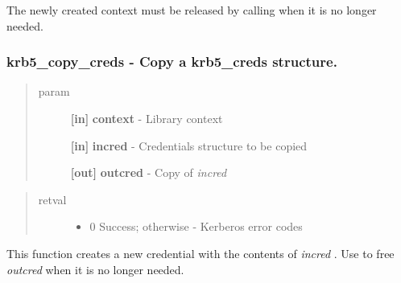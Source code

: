 \documentclass[letterpaper,10pt,english]{sphinxmanual}
\begin{document}
The newly created context must be released by calling {\hyperref[appdev/refs/api/krb5_free_context:krb5_free_context]{}} when it is no longer needed.


\subsubsection{krb5\_copy\_creds -  Copy a krb5\_creds structure.}
\label{appdev/refs/api/krb5_copy_creds:krb5-copy-creds-copy-a-krb5-creds-structure}\label{appdev/refs/api/krb5_copy_creds::doc}

\begin{fulllineitems}
\label{appdev/refs/api/krb5_copy_creds:krb5_copy_creds}
\end{fulllineitems}

\begin{quote}\begin{description}
\item[{param}] \leavevmode
\textbf{{[}in{]}} \textbf{context} - Library context

\textbf{{[}in{]}} \textbf{incred} - Credentials structure to be copied

\textbf{{[}out{]}} \textbf{outcred} - Copy of \emph{incred}

\end{description}\end{quote}
\begin{quote}\begin{description}
\item[{retval}] \leavevmode\begin{itemize}
\item {} 
0   Success; otherwise - Kerberos error codes

\end{itemize}

\end{description}\end{quote}

This function creates a new credential with the contents of \emph{incred} . Use {\hyperref[appdev/refs/api/krb5_free_creds:krb5_free_creds]{}} to free \emph{outcred} when it is no longer needed.
\end{document}
